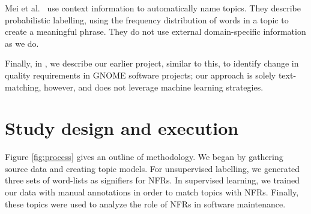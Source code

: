 \documentclass[]{sig-alternate}
\begin{document}
Mei et al.~\cite{Mei2007} use context information to automatically name topics. 
They describe probabilistic labelling, using the frequency distribution of words in a topic to create a meaningful phrase. 
They do not use external domain-specific information as we do.

Finally, in \cite{ernst10refsq}, we describe our earlier project, similar to this, to identify change in quality requirements in GNOME software projects; our approach is solely text-matching, however, and does not leverage machine learning strategies.




\section{Study design and execution}
Figure \ref{fig:process} gives an outline of methodology.
We began by gathering source data and creating topic models. For unsupervised labelling, we generated three sets of word-lists as signifiers for NFRs.
In supervised learning, we trained our data with manual annotations in order to match topics with NFRs. Finally, these topics were used to analyze the role of NFRs in software maintenance.
\end{document}
